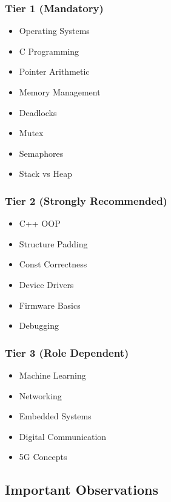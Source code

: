 \documentclass[11pt,a4paper]{article}
\begin{document}
\subsubsection{Tier 1 (Mandatory)}

\begin{itemize}
	\item Operating Systems
	\item C Programming
	\item Pointer Arithmetic
	\item Memory Management
	\item Deadlocks
	\item Mutex
	\item Semaphores
	\item Stack vs Heap
\end{itemize}

\subsubsection{Tier 2 (Strongly Recommended)}

\begin{itemize}
	\item C++ OOP
	\item Structure Padding
	\item Const Correctness
	\item Device Drivers
	\item Firmware Basics
	\item Debugging
\end{itemize}

\subsubsection{Tier 3 (Role Dependent)}

\begin{itemize}
	\item Machine Learning
	\item Networking
	\item Embedded Systems
	\item Digital Communication
	\item 5G Concepts
\end{itemize}


\subsection{Important Observations}
\end{document}

